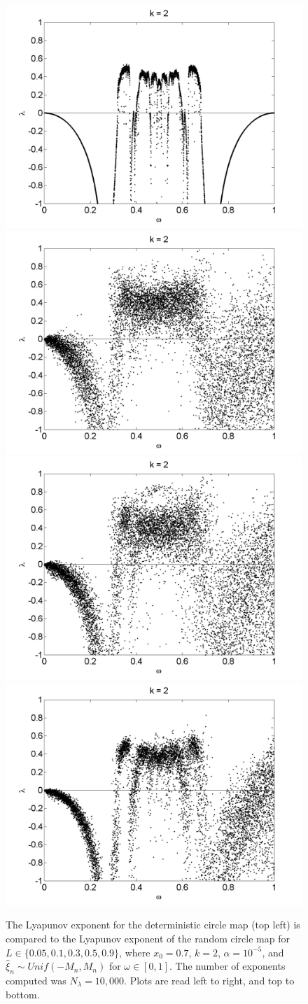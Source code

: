 \begin{figure}[!h]
\caption[Lyapunov exponent in the random circle map (uniform distribution) compared to the
deterministic map, varying $\omega$, $\alpha = 10^{-5}$]{The Lyapunov exponent for the deterministic
  circle map (top left) is compared
  to the Lyapunov exponent of the random circle map for $L \in
  \{0.05,0.1,0.3,0.5,0.9\}$, where $x_0=0.7$, $k=2$, $\alpha =
  10^{-5}$, and $\hat{\xi}_n\sim
  Unif(-M_n,M_n)$ for $\omega \in [0,1]$. The number of exponents computed was $N_\lambda=10,000$. Plots are read left to right, and top to bottom. }\label{fig:rcirclyap_u}
\centering
\includegraphics[width=.5\textwidth]{figs/detcirc_lyap_10000_k_2_w.png}\hfill
\includegraphics[width=.5\textwidth]{figs/rcirc_u_lyap_10000_L_005_k_2_w.png}\\
\includegraphics[width=.5\textwidth]{figs/rcirc_u_lyap_10000_L_01_k_2_w.png}\hfill
\includegraphics[width=.5\textwidth]{figs/rcirc_u_lyap_10000_L_03_k_2_w.png}\\

\end{figure}
